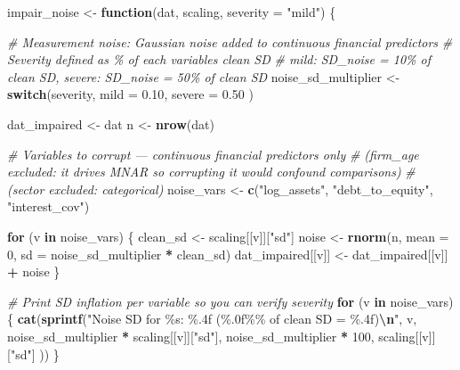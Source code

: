 \documentclass[
]{article}
\newenvironment{Shaded}{\begin{snugshade}}{\end{snugshade}}
\newcommand{\AttributeTok}[1]{\textcolor[rgb]{0.13,0.29,0.53}{#1}}
\newcommand{\CommentTok}[1]{\textcolor[rgb]{0.56,0.35,0.01}{\textit{#1}}}
\newcommand{\ControlFlowTok}[1]{\textcolor[rgb]{0.13,0.29,0.53}{\textbf{#1}}}
\newcommand{\DecValTok}[1]{\textcolor[rgb]{0.00,0.00,0.81}{#1}}
\newcommand{\FloatTok}[1]{\textcolor[rgb]{0.00,0.00,0.81}{#1}}
\newcommand{\FunctionTok}[1]{\textcolor[rgb]{0.13,0.29,0.53}{\textbf{#1}}}
\newcommand{\NormalTok}[1]{#1}
\newcommand{\OtherTok}[1]{\textcolor[rgb]{0.56,0.35,0.01}{#1}}
\newcommand{\SpecialCharTok}[1]{\textcolor[rgb]{0.81,0.36,0.00}{\textbf{#1}}}
\newcommand{\StringTok}[1]{\textcolor[rgb]{0.31,0.60,0.02}{#1}}
\begin{document}
\begin{Shaded}
\begin{Highlighting}[]
\NormalTok{impair\_noise }\OtherTok{\textless{}{-}} \ControlFlowTok{function}\NormalTok{(dat, scaling, }\AttributeTok{severity =} \StringTok{"mild"}\NormalTok{) \{}
  
  \CommentTok{\# Measurement noise: Gaussian noise added to continuous financial predictors}
  \CommentTok{\# Severity defined as \% of each variable\textquotesingle{}s clean SD}
  \CommentTok{\# mild: SD\_noise = 10\% of clean SD, severe: SD\_noise = 50\% of clean SD}
\NormalTok{  noise\_sd\_multiplier }\OtherTok{\textless{}{-}} \ControlFlowTok{switch}\NormalTok{(severity,}
    \AttributeTok{mild   =} \FloatTok{0.10}\NormalTok{,}
    \AttributeTok{severe =} \FloatTok{0.50}
\NormalTok{  )}
  
\NormalTok{  dat\_impaired }\OtherTok{\textless{}{-}}\NormalTok{ dat}
\NormalTok{  n }\OtherTok{\textless{}{-}} \FunctionTok{nrow}\NormalTok{(dat)}
  
  \CommentTok{\# Variables to corrupt — continuous financial predictors only}
  \CommentTok{\# (firm\_age excluded: it drives MNAR so corrupting it would confound comparisons)}
  \CommentTok{\# (sector excluded: categorical)}
\NormalTok{  noise\_vars }\OtherTok{\textless{}{-}} \FunctionTok{c}\NormalTok{(}\StringTok{"log\_assets"}\NormalTok{, }\StringTok{"debt\_to\_equity"}\NormalTok{, }\StringTok{"interest\_cov"}\NormalTok{)}
  
  \ControlFlowTok{for}\NormalTok{ (v }\ControlFlowTok{in}\NormalTok{ noise\_vars) \{}
\NormalTok{    clean\_sd   }\OtherTok{\textless{}{-}}\NormalTok{ scaling[[v]][}\StringTok{"sd"}\NormalTok{]}
\NormalTok{    noise      }\OtherTok{\textless{}{-}} \FunctionTok{rnorm}\NormalTok{(n, }\AttributeTok{mean =} \DecValTok{0}\NormalTok{, }\AttributeTok{sd =}\NormalTok{ noise\_sd\_multiplier }\SpecialCharTok{*}\NormalTok{ clean\_sd)}
\NormalTok{    dat\_impaired[[v]] }\OtherTok{\textless{}{-}}\NormalTok{ dat\_impaired[[v]] }\SpecialCharTok{+}\NormalTok{ noise}
\NormalTok{  \}}
  
  \CommentTok{\# Print SD inflation per variable so you can verify severity}
  \ControlFlowTok{for}\NormalTok{ (v }\ControlFlowTok{in}\NormalTok{ noise\_vars) \{}
    \FunctionTok{cat}\NormalTok{(}\FunctionTok{sprintf}\NormalTok{(}\StringTok{"Noise SD for \%s: \%.4f (\%.0f\%\% of clean SD = \%.4f)}\SpecialCharTok{\textbackslash{}n}\StringTok{"}\NormalTok{,}
\NormalTok{      v,}
\NormalTok{      noise\_sd\_multiplier }\SpecialCharTok{*}\NormalTok{ scaling[[v]][}\StringTok{"sd"}\NormalTok{],}
\NormalTok{      noise\_sd\_multiplier }\SpecialCharTok{*} \DecValTok{100}\NormalTok{,}
\NormalTok{      scaling[[v]][}\StringTok{"sd"}\NormalTok{]}
\NormalTok{    ))}
\NormalTok{  \}}
  

\end{Highlighting}
\end{Shaded}
\end{document}
